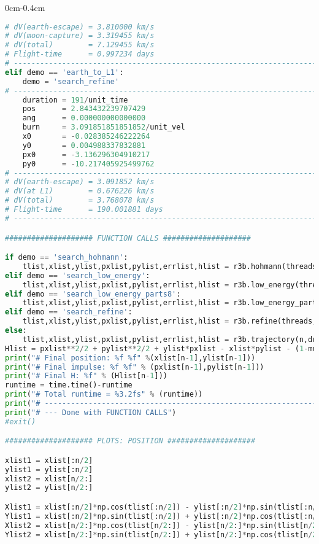 \begin{adjustwidth*}{0cm}{-0.4cm}
\begin{lstlisting}[language=Python]
# dV(earth-escape) = 3.810000 km/s
# dV(moon-capture) = 3.319455 km/s
# dV(total)        = 7.129455 km/s
# Flight-time      = 0.997234 days
# --------------------------------------------------------------------------
elif demo == 'earth_to_L1':
    demo = 'search_refine'
# --------------------------------------------------------------------------
    duration = 191/unit_time
    pos      = 2.843432239707429
    ang      = 0.000000000000000
    burn     = 3.091851851851852/unit_vel
    x0       = -0.028385246222264
    y0       = 0.004988337832881
    px0      = -3.136296304910217
    py0      = -10.217405925499762
# --------------------------------------------------------------------------
# dV(earth-escape) = 3.091852 km/s
# dV(at L1)        = 0.676226 km/s
# dV(total)        = 3.768078 km/s
# Flight-time      = 190.001881 days
# --------------------------------------------------------------------------

#################### FUNCTION CALLS ####################

if demo == 'search_hohmann':
    tlist,xlist,ylist,pxlist,pylist,errlist,hlist = r3b.hohmann(threads,n)
elif demo == 'search_low_energy':
    tlist,xlist,ylist,pxlist,pylist,errlist,hlist = r3b.low_energy(threads,n)
elif demo == 'search_low_energy_parts8':
    tlist,xlist,ylist,pxlist,pylist,errlist,hlist = r3b.low_energy_parts8(threads,n)
elif demo == 'search_refine':
    tlist,xlist,ylist,pxlist,pylist,errlist,hlist = r3b.refine(threads,n,duration,pos,ang,burn,x0,y0,px0,py0)
else:
    tlist,xlist,ylist,pxlist,pylist,errlist,hlist = r3b.trajectory(n,duration,pos,ang,burn,x0,y0,px0,py0)
Hlist = pxlist**2/2 + pylist**2/2 + ylist*pxlist - xlist*pylist - (1-mu)/np.sqrt(np.power(mu+xlist,2)+np.power(ylist,2)) - mu/np.sqrt(np.power(1-mu-xlist,2)+np.power(ylist,2))
print("# Final position: %f %f" %(xlist[n-1],ylist[n-1]))
print("# Final impulse: %f %f" % (pxlist[n-1],pylist[n-1]))
print("# Final H: %f" % (Hlist[n-1]))
runtime = time.time()-runtime
print("# Total runtime = %3.2fs" % (runtime))
print("# --------------------------------------------------------------------------")
print("# --- Done with FUNCTION CALLS")
#exit()

#################### PLOTS: POSITION ####################

xlist1 = xlist[:n/2]
ylist1 = ylist[:n/2]
xlist2 = xlist[n/2:]
ylist2 = ylist[n/2:]

Xlist1 = xlist[:n/2]*np.cos(tlist[:n/2]) - ylist[:n/2]*np.sin(tlist[:n/2])
Ylist1 = xlist[:n/2]*np.sin(tlist[:n/2]) + ylist[:n/2]*np.cos(tlist[:n/2])
Xlist2 = xlist[n/2:]*np.cos(tlist[n/2:]) - ylist[n/2:]*np.sin(tlist[n/2:])
Ylist2 = xlist[n/2:]*np.sin(tlist[n/2:]) + ylist[n/2:]*np.cos(tlist[n/2:])


\end{lstlisting}
\end{adjustwidth*}
